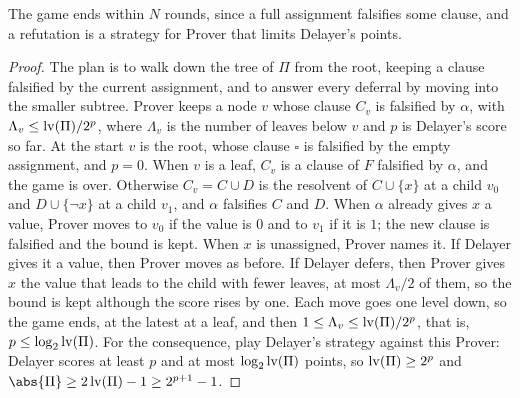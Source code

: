 \begin{refsection}

The game ends within $N$ rounds, since a full assignment falsifies some clause, and a refutation is a strategy for Prover that limits Delayer's points.


\begin{proof}
The plan is to walk down the tree of $\Pi$ from the root, keeping a clause falsified by the current assignment, and to answer every deferral by moving into the smaller subtree. Prover keeps a node $v$ whose clause $C_v$ is falsified by $\alpha$, with $\Lambda_v\le\operatorname{lv}(\Pi)/2^p$, where $\Lambda_v$ is the number of leaves below $v$ and $p$ is Delayer's score so far. At the start $v$ is the root, whose clause $\square$ is falsified by the empty assignment, and $p=0$. When $v$ is a leaf, $C_v$ is a clause of $F$ falsified by $\alpha$, and the game is over. Otherwise $C_v=C\cup D$ is the resolvent of $C\cup\{x\}$ at a child $v_0$ and $D\cup\{\neg x\}$ at a child $v_1$, and $\alpha$ falsifies $C$ and $D$. When $\alpha$ already gives $x$ a value, Prover moves to $v_0$ if the value is $0$ and to $v_1$ if it is $1$; the new clause is falsified and the bound is kept. When $x$ is unassigned, Prover names it. If Delayer gives it a value, then Prover moves as before. If Delayer defers, then Prover gives $x$ the value that leads to the child with fewer leaves, at most $\Lambda_v/2$ of them, so the bound is kept although the score rises by one. Each move goes one level down, so the game ends, at the latest at a leaf, and then $1\le\Lambda_v\le\operatorname{lv}(\Pi)/2^p$, that is, $p\le\log_2\operatorname{lv}(\Pi)$. For the consequence, play Delayer's strategy against this Prover: Delayer scores at least $p$ and at most $\log_2\operatorname{lv}(\Pi)$ points, so $\operatorname{lv}(\Pi)\ge2^p$ and $\abs{\Pi}\ge2\certificateslv(\Pi)-1\ge2^{p+1}-1$.
\end{proof}


\end{refsection}
